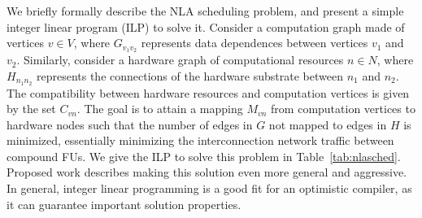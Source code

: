We briefly formally describe the NLA scheduling problem, and present a simple
integer linear program (ILP) to solve it.  Consider a computation graph made of
vertices $v \in V$, where $G_{v_{1}v_{2}}$ represents data dependences between
vertices $v_1$ and $v_2$.  Similarly, consider a hardware graph of computational
resources $n \in N$, where $H_{n_{1}n_2}$ represents the connections of the
hardware substrate between $n_1$ and $n_2$.  The compatibility between hardware
resources and computation vertices 
is given by the set $C_{vn}$.  The goal is to attain a mapping
$M_{vn}$ from computation vertices to hardware nodes such that the number of
edges in $G$ not mapped to edges in $H$ is minimized, essentially minimizing
the interconnection network traffic between compound FUs.  We give the ILP to
solve this problem in Table~\ref{tab:nlasched}.  Proposed work describes
making this solution even more general and aggressive.
In general, integer linear programming is a good fit for an optimistic
compiler, as it can guarantee important solution properties. 



